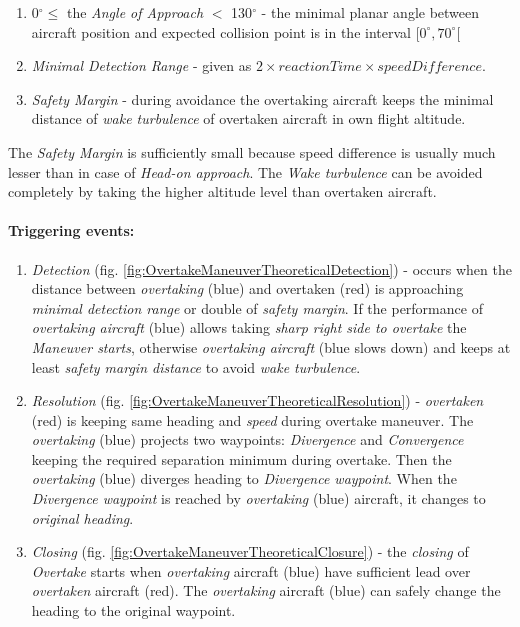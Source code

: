 \begin{enumerate}
    \item 0$^\circ \le$ the \emph{Angle of Approach} $<$ 130$^\circ$ - the minimal planar angle between aircraft position and expected collision point is in the interval $[0^\circ,70^\circ[$
    
    \item \emph{Minimal Detection Range} - given as $2 \times  reaction Time \times speed Difference$. 
    
    \item \emph{Safety Margin} - during avoidance the overtaking aircraft keeps the minimal distance of \emph{wake turbulence} of overtaken aircraft in own flight altitude. 
\end{enumerate}

\begin{note}
    The \emph{Safety Margin} is sufficiently small because speed difference is usually much lesser than in case of  \emph{Head-on approach}. The \emph{Wake turbulence} can be avoided completely by taking the higher altitude level than overtaken aircraft.
\end{note}


\paragraph{Triggering events:}
\begin{enumerate}
    \item \emph{Detection} (fig. \ref{fig:OvertakeManeuverTheoreticalDetection}) - occurs when the distance between \emph{overtaking} (blue) and overtaken (red) is approaching \emph{minimal detection range} or double of \emph{safety margin}. If the performance of \emph{overtaking aircraft} (blue) allows taking \emph{sharp right side to overtake} the \emph{Maneuver starts}, otherwise \emph{overtaking aircraft} (blue slows down) and keeps at least \emph{safety margin distance} to avoid \emph{wake turbulence}.
    
    \item \emph{Resolution} (fig. \ref{fig:OvertakeManeuverTheoreticalResolution}) - \emph{overtaken} (red) is keeping same heading and \emph{speed} during overtake maneuver. The \emph{overtaking} (blue) projects two waypoints: \emph{Divergence} and \emph{Convergence} keeping the required separation minimum during overtake. Then the \emph{overtaking} (blue) diverges heading to \emph{Divergence waypoint}. When the \emph{Divergence waypoint} is reached by \emph{overtaking} (blue) aircraft, it changes to \emph{original heading}.
    
    \item \emph{Closing} (fig. \ref{fig:OvertakeManeuverTheoreticalClosure}) - the \emph{closing} of \emph{Overtake} starts when \emph{overtaking} aircraft (blue) have sufficient lead over \emph{overtaken} aircraft (red). The \emph{overtaking} aircraft (blue) can safely change the heading to the original waypoint.
\end{enumerate}


